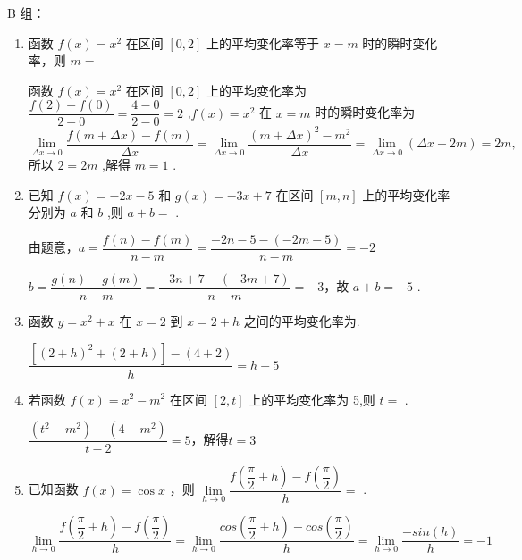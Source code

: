 B 组：
\begin{enumerate}
    \item 函数 $f\left( x\right)  = {x}^{2}$ 在区间 $\left\lbrack  {0,2}\right\rbrack$ 上的平均变化率等于 $x = m$ 时的瞬时变化率，则 $m =$
    \begin{jieda}
        函数 $f\left( x\right)  = {x}^{2}$ 在区间 $\left\lbrack  {0,2}\right\rbrack$ 上的平均变化率为 $\dfrac{f\left( 2\right)  - f\left( 0\right) }{2 - 0} = \dfrac{4 - 0}{2 - 0} = 2$ ,$f\left( x\right)  = {x}^{2}$ 在 $x = m$ 时的瞬时变化率为
        $\mathop{\lim }\limits_{{{\Delta x} \rightarrow  0}}\dfrac{f\left( {m + {\Delta x}}\right)  - f\left( m\right) }{\Delta x} = \mathop{\lim }\limits_{{{\Delta x} \rightarrow  0}}\dfrac{{\left( m + \Delta x\right) }^{2} - {m}^{2}}{\Delta x} = \mathop{\lim }\limits_{{{\Delta x} \rightarrow  0}}\left( {{\Delta x} + {2m}}\right)  = {2m},$
        所以 $2 = {2m}$ ,解得 $m = 1$ .
    \end{jieda}
    
    \item 已知 $f\left( x\right)  =  - {2x} - 5$ 和 $g\left( x\right)  =  - {3x} + 7$ 在区间 $\left\lbrack  {m,n}\right\rbrack$ 上的平均变化率分别为 $a$ 和 $b$ ,则 $a + b =$ .
    \begin{jieda}
        由题意，$a = \dfrac{f\left( n\right)  - f\left( m\right) }{n - m} = \dfrac{-{2n} - 5 - \left( {-{2m} - 5}\right) }{n - m} =  - 2$
        
        $b = \dfrac{g\left( n\right)  - g\left( m\right) }{n - m} = \dfrac{-{3n} + 7 - \left( {-{3m} + 7}\right) }{n - m} =  - 3$，故 $a + b =  - 5$ .
    \end{jieda}
    
    \item 函数 $y = {x}^{2} + x$ 在 $x = 2$ 到 $x = 2 + h$ 之间的平均变化率为.
    \begin{jieda}
        $\dfrac{[(2+h)^2+(2+h)] - (4+2)}{h} = h+5$
    \end{jieda}
    
    \item 若函数 $f\left( x\right)  = {x}^{2} - {m}^{2}$ 在区间 $\left\lbrack  {2,t}\right\rbrack$ 上的平均变化率为 5,则 $t =$ .
    \begin{jieda}
        $\dfrac{(t^2-m^2) - (4-m^2)}{t-2} = 5$，解得$t = 3$
    \end{jieda}
    
    \item 已知函数 $f\left( x\right)  = \cos x$ ，则 $\mathop{\lim }\limits_{{h \rightarrow  0}}\dfrac{f\left( {\dfrac{\pi }{2} + h}\right)  - f\left( \dfrac{\pi }{2}\right) }{h} =$ .
    \begin{jieda}
        $\mathop{\lim }\limits_{{h \rightarrow  0}}\dfrac{f\left( {\dfrac{\pi }{2} + h}\right)  - f\left( \dfrac{\pi }{2}\right) }{h} = \mathop{\lim }\limits_{{h \rightarrow  0}}\dfrac{cos\left( {\dfrac{\pi }{2} + h}\right)  - cos\left( \dfrac{\pi }{2}\right) }{h} = \mathop{\lim }\limits_{{h \rightarrow  0}}\dfrac{-sin(h)}{h} = -1$
    \end{jieda}
    

\end{enumerate}
